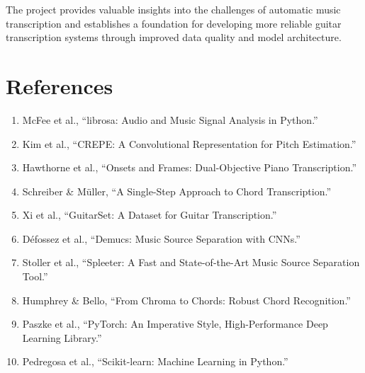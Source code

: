 \documentclass[11pt]{article}
\begin{document}
The project provides valuable insights into the challenges of automatic music transcription and establishes a foundation for developing more reliable guitar transcription systems through improved data quality and model architecture.

\section*{References}
\begin{enumerate}[leftmargin=*,itemsep=2pt]
  \item McFee et al., ``librosa: Audio and Music Signal Analysis in Python.''
  \item Kim et al., ``CREPE: A Convolutional Representation for Pitch Estimation.''
  \item Hawthorne et al., ``Onsets and Frames: Dual-Objective Piano Transcription.''
  \item Schreiber \& Müller, ``A Single-Step Approach to Chord Transcription.''
  \item Xi et al., ``GuitarSet: A Dataset for Guitar Transcription.''
  \item Défossez et al., ``Demucs: Music Source Separation with CNNs.''
  \item Stoller et al., ``Spleeter: A Fast and State-of-the-Art Music Source Separation Tool.''
  \item Humphrey \& Bello, ``From Chroma to Chords: Robust Chord Recognition.''
  \item Paszke et al., ``PyTorch: An Imperative Style, High-Performance Deep Learning Library.''
  \item Pedregosa et al., ``Scikit-learn: Machine Learning in Python.''
\end{enumerate}
\end{document}
